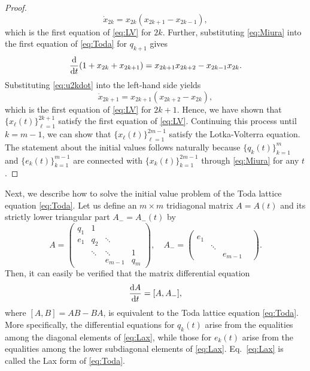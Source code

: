 \documentclass[pdflatex,sn-mathphys-num]{sn-jnl}%
\newcommand{\q}{\quad}
\theoremstyle{thmstyleone}%
\theoremstyle{thmstyletwo}%
\theoremstyle{thmstylethree}%
\begin{document}
\begin{appendices}
\begin{proof}
\begin{equation}
\dot{x}_{2k}=x_{2k}(x_{2k+1}-x_{2k-1}), \label{eq:u2kdot}
\end{equation}
which is the first equation of \eqref{eq:LV} for $2k$. Further, substituting \eqref{eq:Miura} into the first equation of \eqref{eq:Toda} for $q_{k+1}$ gives
\begin{equation}
\frac{{\rm d}}{{\rm d}t}(1+x_{2k}+x_{2k+1})=x_{2k+1}x_{2k+2}-x_{2k-1}x_{2k}.
\end{equation}
Substituting \eqref{eq:u2kdot} into the left-hand side yields
\begin{equation}
\dot{x}_{2k+1}=x_{2k+1}(x_{2k+2}-x_{2k}),
\end{equation}
which is the first equation of \eqref{eq:LV} for $2k+1$. Hence, we have shown that $\{x_{\ell}(t)\}_{\ell=1}^{2k+1}$ satisfy the first equation of \eqref{eq:LV}. Continuing this process until $k=m-1$, we can show that $\{x_{\ell}(t)\}_{\ell=1}^{2m-1}$ satisfy the Lotka-Volterra equation. The statement about the initial values follows naturally because $\{q_k(t)\}_{k=1}^m$ and $\{e_k(t)\}_{k=1}^{m-1}$ are connected with $\{x_k(t)\}_{k=1}^{2m-1}$ through \eqref{eq:Miura} for any $t$.
\end{proof}

Next, we describe how to solve the initial value problem of the Toda lattice equation \eqref{eq:Toda}. Let us define an $m\times m$ tridiagonal matrix $A=A(t)$ and its strictly lower triangular part $A_-=A_-(t)$ by
\begin{equation}
A=\left(\begin{array}{cccc}
q_1 & 1 & & \\
e_1 & q_2 & \ddots & \\
& \ddots & \ddots & 1 \\
& & e_{m-1} & q_m
\end{array}
\right), \q
A_-=\left(\begin{array}{cccc}
& & & \\
e_1 & & & \\
& \ddots & & \\
& & e_{m-1} &
\end{array}
\right).
\end{equation}
Then, it can easily be verified that the matrix differential equation
\begin{equation}
\frac{{\rm d}A}{{\rm d}t} =[A,A_-],
\label{eq:Lax}
\end{equation}
where $[A,B]=AB-BA$, is equivalent to the Toda lattice equation \eqref{eq:Toda}. More specifically, the differential equations for $q_k(t)$ arise from the equalities among the diagonal elements of \eqref{eq:Lax}, while those for $e_k(t)$ arise from the equalities among the lower subdiagonal elements of \eqref{eq:Lax}. Eq.~\eqref{eq:Lax} is called the Lax form of \eqref{eq:Toda}.


\end{appendices}
\end{document}
